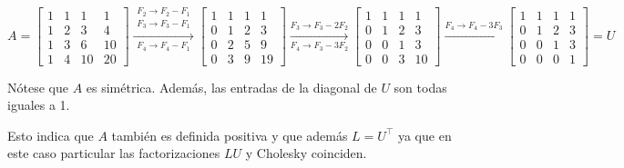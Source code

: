 \begin{enumerate}[label=\color{red}\textbf{\arabic*)}, leftmargin=*]
	$A=\begin{bmatrix}
		1 & 1 & 1 & 1\\
		1 & 2 & 3 & 4\\
		1 & 3 & 6 & 10\\
		1 & 4 & 10 & 20
		\end{bmatrix}\xrightarrow[F_4\to F_4-F_1]{\begin{array}{l}
		F_2\to F_2-F_1\\
		F_3\to F_3-F_1
		\end{array}}\begin{bmatrix}
		1 & 1 & 1 & 1 \\
		0 & 1 & 2 & 3 \\
		0 & 2 & 5 & 9 \\
		0 & 3 & 9 & 19
		\end{bmatrix}\xrightarrow[F_4\to F_3-3F_2]{F_3\to F_3-2F_2}\begin{bmatrix}
		1 & 1 & 1 & 1 \\
		0 & 1 & 2 & 3 \\
		0 & 0 & 1 & 3 \\
		0 & 0 & 3 & 10
		\end{bmatrix}\xrightarrow{F_4\to F_4-3F_3}\begin{bmatrix}
		1 & 1 & 1 & 1 \\
		0 & 1 & 2 & 3 \\
		0 & 0 & 1 & 3 \\
		0 & 0 & 0 & 1
		\end{bmatrix}=U$
		
	Nótese que $A$ es simétrica. Además, las entradas de la diagonal de $U$ son todas iguales a 1.
	
	Esto indica que $A$ también es definida positiva y que además $L=U^\intercal$ ya que en este caso particular las factorizaciones $LU$ y Cholesky coinciden.
	

\end{enumerate}
